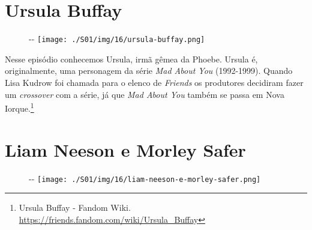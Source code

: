 \hypertarget{ursula-buffay}{%
\section{Ursula Buffay}\label{ursula-buffay}}

\begin{figure}[!ht]
  \begin{adjustwidth}{-\oddsidemargin-1in}{-\rightmargin}
    \centering
    \texttt{[image: ./S01/img/16/ursula-buffay.png]}
  \end{adjustwidth}
\end{figure}

Nesse episódio conhecemos Ursula, irmã gêmea da Phoebe. Ursula é,
originalmente, uma personagem da série \emph{Mad About You} (1992-1999).
Quando Lisa Kudrow foi chamada para o elenco de \emph{Friends} os
produtores decidiram fazer um \emph{crossover} com a série, já que
\emph{Mad About You} também se passa em Nova Iorque.\footnote{\sloppy Ursula Buffay - Fandom Wiki. \url{https://friends.fandom.com/wiki/Ursula_Buffay}}

\hypertarget{liam-neeson-e-morley-safer}{%
\section{Liam Neeson e Morley Safer}\label{liam-neeson-e-morley-safer}}

\begin{figure}[!ht]
  \begin{adjustwidth}{-\oddsidemargin-1in}{-\rightmargin}
    \centering
    \texttt{[image: ./S01/img/16/liam-neeson-e-morley-safer.png]}
  \end{adjustwidth}
\end{figure}

